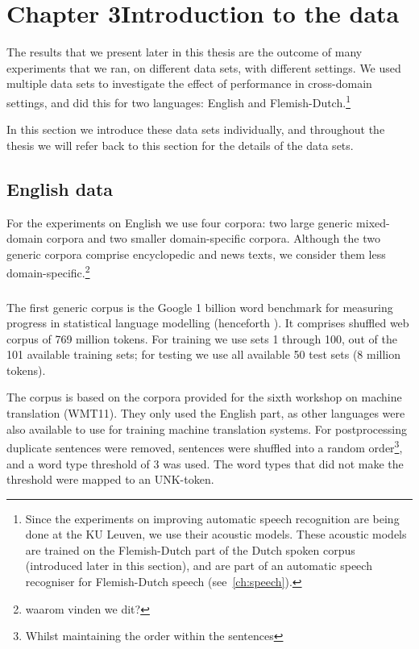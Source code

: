 \chapter{Chapter 3\newline Introduction to the data}\label{chap:data}
The results that we present later in this thesis are the outcome of many experiments that we ran, on different data sets, with different settings. We used multiple data sets to investigate the effect of performance in cross-domain settings, and did this for two languages: English and Flemish-Dutch.\footnote{Since the experiments on improving automatic speech recognition are being done at the KU Leuven, we use their acoustic models. These acoustic models are trained on the Flemish-Dutch part of the Dutch spoken corpus (introduced later in this section), and are part of an automatic speech recogniser for Flemish-Dutch speech (see~\cref{ch:speech}).} 

In this section we introduce these data sets individually, and throughout the thesis we will refer back to this section for the details of the data sets.

\section{English data}
For the experiments on English we use four corpora: two large generic mixed-domain corpora and two smaller domain-specific corpora. Although the two generic corpora comprise encyclopedic and news texts, we consider them less domain-specific.\footnote{waarom vinden we dit?}
  
  \subsection{\obw}
  
  The first generic corpus is the Google 1 billion word benchmark for measuring progress in statistical language modelling (henceforth \obw). It comprises shuffled web corpus of 769 million tokens.\cite{chelba2013one} For training we use sets 1 through 100, out of the 101 available training sets; for testing we use all available 50 test sets (8 million tokens).
  
  The corpus is based on the corpora provided for the sixth workshop on machine translation (WMT11). They only used the English part, as other languages were also available to use for training machine translation systems. For postprocessing duplicate sentences were removed, sentences were shuffled into a random order\footnote{Whilst maintaining the order within the sentences}, and a word type threshold of 3 was used. The word types that did not make the threshold were mapped to an UNK-token.
  
